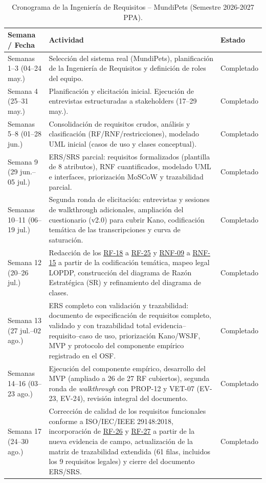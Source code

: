 \documentclass[journal,onecolumn]{IEEEtran}
\begin{document}
	\begin{table}[H]
		\caption{Cronograma de la Ingeniería de Requisitos -- MundiPets (Semestre 2026-2027 PPA).}
		\centering
		
		\begin{tabularx}{\linewidth}{|C{2.5cm}|X|C{2.8cm}|}
			\hline
			\textbf{Semana / Fecha} & \textbf{Actividad} & \textbf{Estado} \\
			\hline
			Semanas 1--3 (04--24 may.) & Selección del sistema real (MundiPets), planificación de la Ingeniería de Requisitos y definición de roles del equipo. & Completado \\
			\hline
			Semana 4 (25--31 may.) & Planificación y elicitación inicial. Ejecución de entrevistas estructuradas a stakeholders (17--29 may.). & Completado \\
			\hline
			Semanas 5--8 (01--28 jun.) & Consolidación de requisitos crudos, análisis y clasificación (RF/RNF/restricciones), modelado UML inicial (casos de uso y clases conceptual). & Completado \\
			\hline
			Semana 9 (29 jun.--05 jul.) & ERS/SRS parcial: requisitos formalizados (plantilla de 8 atributos), RNF cuantificados, modelado UML e interfaces, priorización MoSCoW y trazabilidad parcial. & Completado \\
			\hline
			Semanas 10--11 (06--19 jul.) & Segunda ronda de elicitación: entrevistas y sesiones de walkthrough adicionales, ampliación del cuestionario (v2.0) para cubrir Kano, codificación temática de las transcripciones y curva de saturación. & Completado \\
			\hline
			Semana 12 (20--26 jul.) & Redacción de los \hyperref[tab:RF-18]{RF-18} a \hyperref[tab:RF-25]{RF-25} y \hyperref[tab:RNF-09]{RNF-09} a \hyperref[tab:RNF-15]{RNF-15} a partir de la codificación temática, mapeo legal LOPDP, construcción del diagrama de Razón Estratégica (SR) y refinamiento del diagrama de clases. & Completado \\
			\hline
			Semana 13 (27 jul.--02 ago.) & ERS completo con validación y trazabilidad: documento de especificación de requisitos completo, validado y con trazabilidad total evidencia--requisito--caso de uso, priorización Kano/WSJF, MVP y protocolo del componente empírico registrado en el OSF. & Completado \\
			\hline
			Semanas 14--16 (03--23 ago.) & Ejecución del componente empírico, desarrollo del MVP (ampliado a 26 de 27 RF cubiertos), segunda ronda de \emph{walkthrough} con PROP-12 y VET-07 (EV-23, EV-24), revisión integral del documento. & Completado \\
			\hline
			Semana 17 (24--30 ago.) & Corrección de calidad de los requisitos funcionales conforme a ISO/IEC/IEEE 29148:2018, incorporación de \hyperref[tab:RF-26]{RF-26} y \hyperref[tab:RF-27]{RF-27} a partir de la nueva evidencia de campo, actualización de la matriz de trazabilidad extendida (61 filas, incluidos los 9 requisitos legales) y cierre del documento ERS/SRS. & Completado \\
			\hline
		\end{tabularx}
	\end{table}
	
\end{document}

